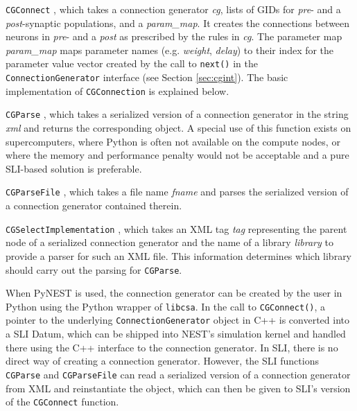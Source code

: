 \documentclass{frontiersSCNS} %
\begin{document}
\begin{unlist}
\item[\tt CGConnect], which takes a connection generator \emph{cg},
  lists of GIDs for \emph{pre}- and a \emph{post}-synaptic
  populations, and a \emph{param\_map}. It creates the connections
  between neurons in \emph{pre}- and a \emph{post} as prescribed by
  the rules in \emph{cg}. The parameter map \emph{param\_map} maps
  parameter names (e.g. \emph{weight}, \emph{delay}) to their index
  for the parameter value vector created by the call to \verb|next()|
  in the \verb|ConnectionGenerator| interface (see Section
  \ref{sec:cgint}). The basic implementation of \verb|CGConnection| is
  explained below.
\item[\tt CGParse], which takes a serialized version of a connection
  generator in the string \emph{xml} and returns the corresponding
  object. A special use of this function exists on supercomputers,
  where Python is often not available on the compute nodes, or where
  the memory and performance penalty would not be acceptable and a
  pure SLI-based solution is preferable.
\item[\tt CGParseFile], which takes a file name \emph{fname} and parses
  the serialized version of a connection generator contained therein.
\item[\tt CGSelectImplementation], which takes an XML tag \emph{tag}
  representing the parent node of a serialized connection generator
  and the name of a library \emph{library} to provide a parser for
  such an XML file. This information determines which library should
  carry out the parsing for \verb|CGParse|.
\end{unlist}

When PyNEST is used, the connection generator can be created by the
user in Python using the Python wrapper of \verb|libcsa|. In the call
to \verb|CGConnect()|, a pointer to the underlying
\verb|ConnectionGenerator| object in C++ is converted into a SLI
Datum, which can be shipped into NEST's simulation kernel and handled
there using the C++ interface to the connection generator. In SLI,
there is no direct way of creating a connection generator. However,
the SLI functions \verb|CGParse| and \verb|CGParseFile| can read a
serialized version of a connection generator from XML and
reinstantiate the object, which can then be given to SLI's version of
the \verb|CGConnect| function.
\end{document}
